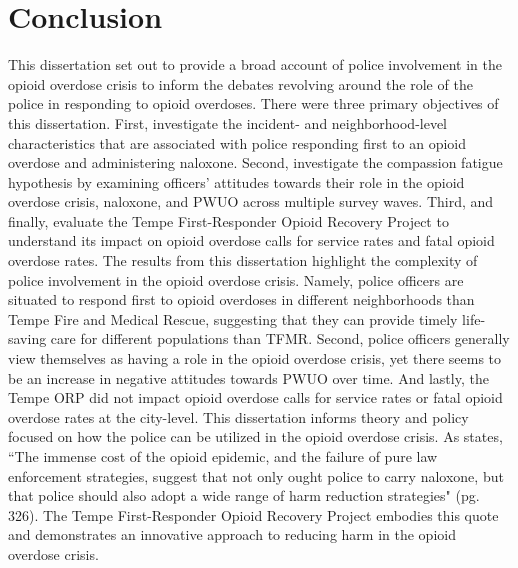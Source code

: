\section{\centering Conclusion}
This dissertation set out to provide a broad account of police involvement in the opioid overdose crisis to inform the debates revolving around the role of the police in responding to opioid overdoses. There were three primary objectives of this dissertation. First, investigate the incident- and neighborhood-level characteristics that are associated with police responding first to an opioid overdose and administering naloxone. Second, investigate the compassion fatigue hypothesis by examining officers' attitudes towards their role in the opioid overdose crisis, naloxone, and PWUO across multiple survey waves. Third, and finally, evaluate the Tempe First-Responder Opioid Recovery Project to understand its impact on opioid overdose calls for service rates and fatal opioid overdose rates. The results from this dissertation highlight the complexity of police involvement in the opioid overdose crisis. Namely, police officers are situated to respond first to opioid overdoses in different neighborhoods than Tempe Fire and Medical Rescue, suggesting that they can provide timely life-saving care for different populations than TFMR. Second, police officers generally view themselves as having a role in the opioid overdose crisis, yet there seems to be an increase in negative attitudes towards PWUO over time. And lastly, the Tempe ORP did not impact opioid overdose calls for service rates or fatal opioid overdose rates at the city-level. This dissertation informs theory and policy focused on how the police can be utilized in the opioid overdose crisis. As \textcite{monaghan_broken_2022} states, ``The immense cost of the opioid epidemic, and the failure of pure law enforcement strategies, suggest that not only ought police to carry naloxone, but that police should also adopt a wide range of harm reduction strategies" (pg. 326). The Tempe First-Responder Opioid Recovery Project embodies this quote and demonstrates an innovative approach to reducing harm in the opioid overdose crisis. 








